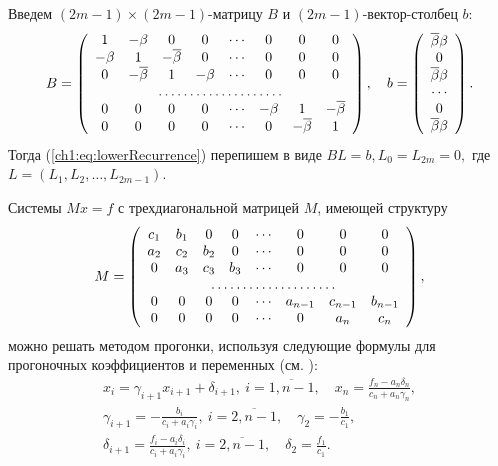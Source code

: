 {Введем $(2m-1)\times(2m-1)$-матрицу $B$ и $(2m-1)$-вектор-столбец $b$:
\begin{equation*}
  B =
  \left(
    \begin{array}{cccccccc}
      1      & -\Co  & 0       & 0      & \cdots & 0      & 0       & 0       \\
      -\Co & 1       & -\DCo & 0      & \cdots & 0      & 0       & 0       \\
      0      & -\DCo & 1       & -\Co & \cdots & 0      & 0       & 0       \\
      \hdotsfor{8}                                                              \\
      0      & 0       & 0       & 0      & \cdots & -\Co & 1       & -\DCo \\
      0      & 0       & 0       & 0      & \cdots & 0      & -\DCo & 1 
    \end{array}
  \right),\quad
  b = \left(
    \begin{array}{c}
      \DCo\Co \\
      0           \\
      \DCo\Co \\
      \cdots      \\
      0           \\
      \DCo\Co
    \end{array}
  \right).
\end{equation*}
Тогда (\ref{ch1:eq:lowerRecurrence}) перепишем в виде $ BL = b, L_0 = L_{2m} = 0, $ где $L = (L_1, L_2, \ldots, L_{2m-1})$.

Системы $ Mx = f $ с трехдиагональной матрицей $ M $, имеющей структуру
\[
  M = \left(\begin{array}{cccccccc}
              c_1 & b_1 & 0   & 0   & \cdots & 0       & 0       & 0       \\
              a_2 & c_2 & b_2 & 0   & \cdots & 0       & 0       & 0       \\
              0   & a_3 & c_3 & b_3 & \cdots & 0       & 0       & 0       \\
              \hdotsfor{8}                                                 \\
              0   & 0   & 0   & 0   & \cdots & a_{n-1} & c_{n-1} & b_{n-1} \\
              0   & 0   & 0   & 0   & \cdots & 0       & a_n     & c_n
            \end{array}\right),
\]
можно решать методом прогонки, используя следующие формулы для прогоночных коэффициентов и переменных (см. \cite{samarsky89}):
\begin{gather}
  \label{ch1:eq:tridiagonal-book}
  x_i = \gamma_{i+1} x_{i+1} + \delta_{i+1}, \: i = \overline{1,n-1},
  \quad
  x_n = \frac{f_n - a_n\delta_n}{c_n + a_n\gamma_n}, \\
  \gamma_{i+1} = -\frac{b_i}{c_i + a_i\gamma_i}, \: i = \overline{2,
    n-1}, \quad
  \gamma_2 = -\frac{b_1}{c_1}, \\
  \delta_{i+1} = \frac{f_i - a_i\delta_i}{c_i + a_i\gamma_i}, \: i =
  \overline{2, n-1}, \quad \delta_2 = \frac{f_1}{c_1}.
\end{gather}

}
